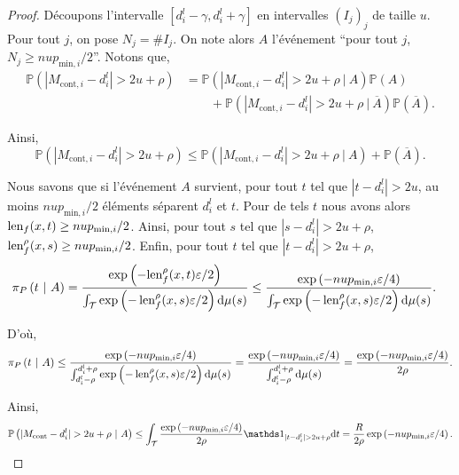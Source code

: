 \begin{proof}
    Découpons l'intervalle \([d_i^l - \gamma, d_i^l + \gamma]\) en intervalles \((I_j)_j\) de taille \(u\). Pour tout \(j\), on pose \(N_j = \#I_j\). On note alors \(A\) l'événement ``pour tout \(j\), \(N_j \geq nup_{\text{min}, i}/2\)''. Notons que,
    \begin{align*}
        \mathbb P\left( |M_{\text{cont}, i} - d_i^l| > 2u + \rho \right) & = \mathbb P\left( |M_{\text{cont}, i} - d_i^l| > 2u + \rho \ | \ A \right)\mathbb P\left( A \right)\\
        & \quad \quad  + \mathbb P\left( |M_{\text{cont}, i} - d_i^l| > 2u + \rho \ | \ \overline A \right) \mathbb P \left( \overline A  \right).
    \end{align*}

    Ainsi,
    \[
        \mathbb P\left( |M_{\text{cont}, i} - d_i^l| > 2u + \rho \right) \leq \mathbb P\left( |M_{\text{cont}, i} - d_i^l| > 2u + \rho \ | \ A \right) +  \mathbb P \left( \overline A  \right).
    \]

    Nous savons que si l'événement \(A\) survient, pour tout \(t\) tel que \(|t - d_i^l| > 2u\), au moins \(nup_{\text{min}, i}/2\) éléments séparent \(d_i^l\) et \(t\). Pour de tels \(t\) nous avons alors \(\operatorname{len}_f(x,t) \geq nup_{\text{min}, i}/2\). Ainsi, pour tout \(s\) tel que \(|s - d_i^l| > 2u + \rho\), \(\operatorname{len}_f^\rho(x,s) \geq nup_{\text{min}, i}/2\). Enfin, pour tout \(t\) tel que \(|t - d_i^l| > 2u + \rho\),
    \begin{align*}
        \pi_P\left( t\ |\ A \right) & = \dfrac{\exp\left( -{\operatorname{len}_f^\rho(x,t)\varepsilon}/{2} \right)}{\int_\mathcal T \exp\left( {-\operatorname{len}_f^\rho(x,s)\varepsilon}/{2} \right)\mathrm{d} \mu(s)} \leq \dfrac{\exp\left( -{nup_{\text{min}, i}\varepsilon}/{4} \right)}{\int_\mathcal T \exp\left( {-\operatorname{len}_f^\rho(x,s)\varepsilon}/{2} \right)\mathrm{d} \mu(s)}.
    \end{align*}

    D'où,
    \[
        \pi_P\left( t\ |\ A \right) \leq \dfrac{\exp\left( -{nup_{\text{min}, i}\varepsilon}/{4} \right)}{\int_{d_i^l-\rho}^{d_i^l+\rho} \exp\left( {-\operatorname{len}_f^\rho(x,s)\varepsilon}/{2} \right)\mathrm{d} \mu(s)} = \dfrac{\exp\left( -{nup_{\text{min}, i}\varepsilon}/{4} \right)}{\int_{d_i^l-\rho}^{d_i^l+\rho}\mathrm{d} \mu(s)} = \dfrac{\exp\left( -{nup_{\text{min}, i}\varepsilon}/{4} \right)}{2\rho}.
    \]

    Ainsi,
    \begin{align*}
        \mathbb P\left( |M_{\text{cont}} - d_i^l| > 2u + \rho \ | \ A \right) \leq \int_\mathcal T \dfrac{\exp\left( -{nup_{\text{min}, i}\varepsilon}/{4} \right)}{2\rho}\un_{| t - d_i^l| > 2u + \rho} \dt t = \dfrac{R}{2\rho}\exp\left( -{nup_{\text{min}, i}\varepsilon}/{4} \right).
    \end{align*}



\end{proof}
